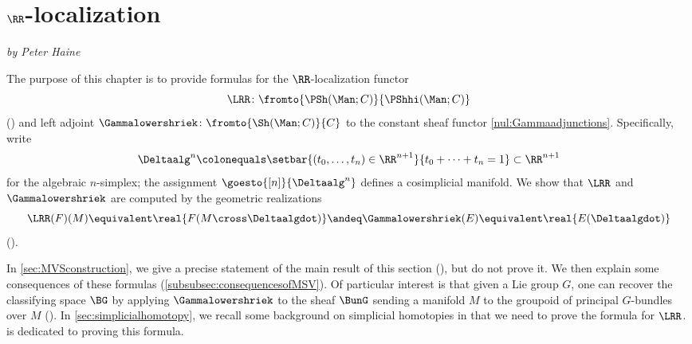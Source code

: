 

\section{\texorpdfstring{$ \RR $}{ℝ}-localization}\label{sec:localization}
\textit{by Peter Haine}

The purpose of this chapter is to provide formulas for the $ \RR $-localization functor
\begin{equation*}
	\LRR \colon \fromto{\PSh(\Man;C)}{\PShhi(\Man;C)}
\end{equation*}
() and left adjoint $ \Gammalowershriek \colon \fromto{\Sh(\Man;C)}{C} $ to the constant sheaf functor \cref{nul:Gammaadjunctions}.
Specifically, write 
\begin{equation*}
	\Deltaalg^n \colonequals \setbar{(t_0,\ldots,t_{n}) \in \RR^{n+1}}{t_0 + \cdots + t_{n} = 1} \subset \RR^{n+1} 
\end{equation*}
for the algebraic $ n $-simplex; the assignment $ \goesto{[n]}{\Deltaalg^n} $ defines a cosimplicial manifold.
We show that $ \LRR $ and $ \Gammalowershriek $ are computed by the geometric realizations
\begin{equation*}
	\LRR(F)(M) \equivalent \real{F(M \cross \Deltaalgdot)} \andeq \Gammalowershriek(E) \equivalent \real{E(\Deltaalgdot)}
\end{equation*}
().

In \cref{sec:MVSconstruction}, we give a precise statement of the main result of this section (), but do not prove it.
We then explain some consequences of these formulas (\cref{subsubsec:consequencesofMSV}). 
Of particular interest is that given a Lie group $ G $, one can recover the classifying space $ \BG $ by applying $ \Gammalowershriek $ to the sheaf $ \BunG $ sending a manifold $ M $ to the groupoid of principal $ G $-bundles over $ M $ ().
In \cref{sec:simplicialhomotopy}, we recall some background on simplicial homotopies in \categories that we need to prove the formula for $ \LRR $.
 is dedicated to proving this formula.


